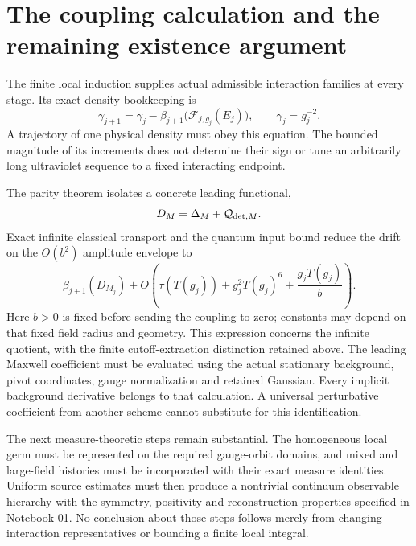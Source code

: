 \section{The coupling calculation and the remaining existence argument}
\label{fin-next}

The finite local induction supplies actual admissible interaction
families at every stage. Its exact density bookkeeping is
\[
 \gamma_{j+1}=\gamma_j-
      \beta_{j+1}\bigl(\mathcal F_{j,g_j}(E_j)\bigr),
 \qquad \gamma_j=g_j^{-2}.
\]
A trajectory of one physical density must obey this equation.
The bounded magnitude of its increments does not determine their
sign or tune an arbitrarily long ultraviolet sequence to a fixed
interacting endpoint.

The parity theorem isolates a concrete leading functional,
\[
 D_M=\Delta_M+\mathcal Q_{{\rm det},M}.
\]
Exact infinite classical transport and the quantum input bound
reduce the drift on the \(O(b^2)\) amplitude envelope to
\[
 \beta_{j+1}(D_{M_j})+
 O\!\left(\tau(T(g_j))+g_j^2T(g_j)^6+
                         \frac{g_jT(g_j)}b\right).
\]
Here \(b>0\) is fixed before sending the coupling to zero;
constants may depend on that fixed field radius and geometry.
This expression concerns the infinite quotient, with the
finite cutoff-extraction distinction retained above.
The leading Maxwell coefficient must be evaluated using the actual
stationary background, pivot coordinates, gauge normalization and
retained Gaussian. Every implicit background derivative belongs
to that calculation. A universal perturbative coefficient from
another scheme cannot substitute for this identification.

The next measure-theoretic steps remain substantial. The homogeneous
local germ must be represented on the required gauge-orbit domains,
and mixed and large-field histories must be incorporated with their
exact measure identities. Uniform source estimates must then produce
a nontrivial continuum observable hierarchy with the symmetry,
positivity and reconstruction properties specified in Notebook 01.
No conclusion about those steps follows merely from changing
interaction representatives or bounding a finite local integral.

